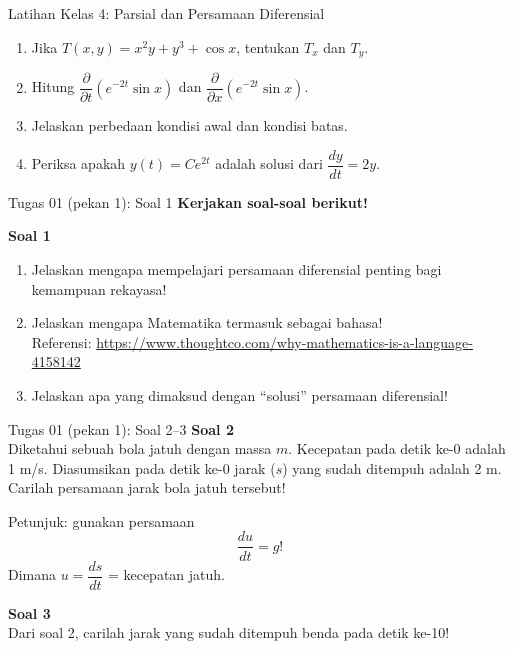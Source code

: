 \documentclass[aspectratio=169,11pt]{beamer}
\begin{document}
\begin{frame}{Latihan Kelas 4: Parsial dan Persamaan Diferensial}
\small
\begin{enumerate}
  \item Jika $T(x,y)=x^2y+y^3+\cos x$, tentukan $T_x$ dan $T_y$.
  \item Hitung $\dfrac{\partial}{\partial t}\left(e^{-2t}\sin x\right)$ dan $\dfrac{\partial}{\partial x}\left(e^{-2t}\sin x\right)$.
  \item Jelaskan perbedaan kondisi awal dan kondisi batas.
  \item Periksa apakah $y(t)=Ce^{2t}$ adalah solusi dari $\dfrac{dy}{dt}=2y$.
\end{enumerate}
\end{frame}

\begin{frame}{Tugas 01 (pekan 1): Soal 1}
\small
\textbf{Kerjakan soal-soal berikut!}
\vspace{0.2cm}

\textbf{Soal 1}
\begin{enumerate}
  \item[1a.] Jelaskan mengapa mempelajari persamaan diferensial penting bagi kemampuan rekayasa!
  \item[1b.] Jelaskan mengapa Matematika termasuk sebagai bahasa!\\
  {\scriptsize Referensi: \url{https://www.thoughtco.com/why-mathematics-is-a-language-4158142}}
  \item[1c.] Jelaskan apa yang dimaksud dengan ``solusi'' persamaan diferensial!
\end{enumerate}
\end{frame}

\begin{frame}{Tugas 01 (pekan 1): Soal 2--3}
\small
\textbf{Soal 2}\\
Diketahui sebuah bola jatuh dengan massa $m$. Kecepatan pada detik ke-0 adalah 1 m/s. Diasumsikan pada detik ke-0 jarak ($s$) yang sudah ditempuh adalah 2 m. Carilah persamaan jarak bola jatuh tersebut!

\vspace{0.25cm}
Petunjuk: gunakan persamaan
\[
\frac{du}{dt}=g!
\]
Dimana $u=\dfrac{ds}{dt}$ = kecepatan jatuh.

\vspace{0.3cm}
\textbf{Soal 3}\\
Dari soal 2, carilah jarak yang sudah ditempuh benda pada detik ke-10!
\end{frame}
\end{document}
